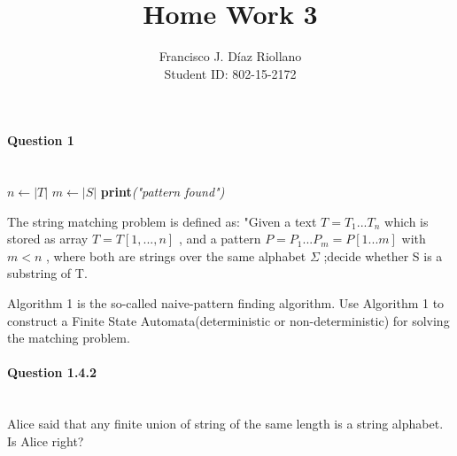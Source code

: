 \documentclass{report}
\title{Home Work 3}
\author{Francisco J. Díaz Riollano \\ Student ID: 802-15-2172 }
\newcommand{\me}[1]{
\begin{math}
#1
\end{math}
}
\begin{document}
\maketitle
\paragraph{\Large{Question 1\\ \\}}


\begin{algorithm}
  \begin{algorithmic}[1]
      \State $n\gets |T|$
      \State $m\gets |S|$
      	\State \textbf{print}\textit{("pattern found")}
      \EndIf
      \EndFor     
    \EndProcedure
  \end{algorithmic}
\end{algorithm}


The string matching problem is defined as: "Given a text \me{T=T_1 ... T_n} which is stored as array \me{T= T[1,...,n]} , and a pattern \me{P = P_1 ... P_m = P[1...m]} with \me{m<n}, where both are strings over the same alphabet \me{\Sigma};decide whether S is a substring of T.

Algorithm 1 is the so-called naive-pattern finding algorithm. Use Algorithm 1 to construct a Finite State Automata(deterministic or non-deterministic) for solving the matching problem.

 
 
 
 
\paragraph{\Large{Question 1.4.2\\ \\}}
Alice said that any finite union of string of the same length is a string alphabet. Is Alice right?
\
\end{document}
